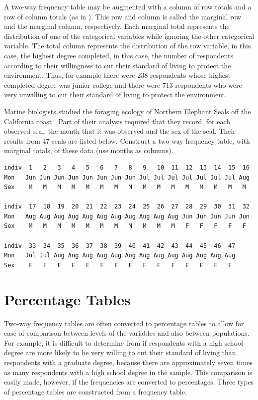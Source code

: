 \documentclass[10pt,openany]{book}\usepackage[]{graphicx}\usepackage[]{color}
\begin{document}
A two-way frequency table may be augmented with a column of row totals and a row of column totals (as in ).  This row and column is called the marginal row and the marginal column, respectively.  Each marginal total represents the distribution of one of the categorical variables while ignoring the other categorical variable.  The total column represents the distribution of the row variable; in this case, the highest degree completed, in this case, the number of respondents according to their willingness to cut their standard of living to protect the environment.  Thus, for example there were 238 respondents whose highest completed degree was junior college and there were 713 respondents who were very unwilling to cut their standard of living to protect the environment.

\vspace{-12pt}
\begin{exsection}
  \item \label{revex:cbEDASeal1} Marine biologists studied the foraging ecology of Northern Elephant Seals off the California coast \citep{LeBoeufetal2000}.  Part of their analysis required that they record, for each observed seal, the month that it was observed and the sex of the seal.  Their results from 47 seals are listed below.  Construct a two-way frequency table, with marginal totals, of these data (use months as columns). 
\begin{Verbatim}
indiv  1   2   3   4   5   6   7   8   9   10  11  12  13  14  15  16
Mon   Jun Jun Jun Jun Jun Jun Jun Jun Jul Jul Jul Jul Jul Jul Jul Aug
Sex    M   M   M   M   M   M   M   M   M   M   M   M   M   M   M   M

indiv  17  18  19  20  21  22  23  24  25  26  27  28  29  30  31  32
Mon   Aug Aug Aug Aug Aug Aug Aug Aug Aug Aug Aug Jun Jun Jun Jun Jun
Sex    M   M   M   M   M   M   M   M   M   M   M   F   F   F   F   F

indiv  33  34  35  36  37  38  39  40  41  42  43  44  45  46  47
Mon   Jul Jul Aug Aug Aug Aug Aug Aug Aug Aug Aug Aug Aug Aug Aug
Sex    F   F   F   F   F   F   F   F   F   F   F   F   F   F   F
\end{Verbatim}
\end{exsection}

\section{Percentage Tables}
\vspace{-12pt}
Two-way frequency tables are often converted to percentage tables to allow for ease of comparison between levels of the variables and also between populations.  For example, it is difficult to determine from  if respondents with a high school degree are more likely to be very willing to cut their standard of living than respondents with a graduate degree, because there are approximately seven times as many respondents with a high school degree in the sample.  This comparison is easily made, however, if the frequencies are converted to percentages.  Three types of percentage tables are constructed from a frequency table.
\end{document}
